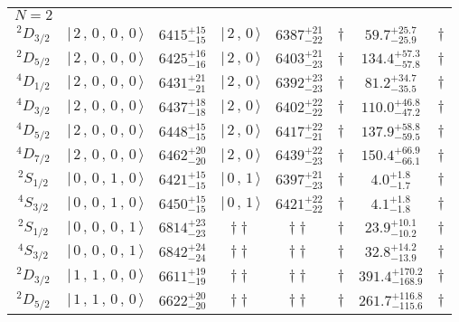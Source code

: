 \begin{tabular}{c| c c c c c c c}
\hline
 $N=2$  &  &  &  &  &  \\ 
$^{2}D_{3/2}$ & $\vert \,2\,,\,0\,,\,0\,,\,0 \,\rangle $ & $6415^{+15}_{-15}$ & $\vert \,2\,,\,0 \,\rangle$ & $6387^{+21}_{-22}$ & $\dagger$ & $59.7^{+25.7}_{-25.9}$ & $\dagger$ \\ 
$^{2}D_{5/2}$ & $\vert \,2\,,\,0\,,\,0\,,\,0 \,\rangle $ & $6425^{+16}_{-16}$ & $\vert \,2\,,\,0 \,\rangle$ & $6403^{+21}_{-23}$ & $\dagger$ & $134.4^{+57.3}_{-57.8}$ & $\dagger$ \\ 
$^{4}D_{1/2}$ & $\vert \,2\,,\,0\,,\,0\,,\,0 \,\rangle $ & $6431^{+21}_{-21}$ & $\vert \,2\,,\,0 \,\rangle$ & $6392^{+23}_{-23}$ & $\dagger$ & $81.2^{+34.7}_{-35.5}$ & $\dagger$ \\ 
$^{4}D_{3/2}$ & $\vert \,2\,,\,0\,,\,0\,,\,0 \,\rangle $ & $6437^{+18}_{-18}$ & $\vert \,2\,,\,0 \,\rangle$ & $6402^{+22}_{-22}$ & $\dagger$ & $110.0^{+46.8}_{-47.2}$ & $\dagger$ \\ 
$^{4}D_{5/2}$ & $\vert \,2\,,\,0\,,\,0\,,\,0 \,\rangle $ & $6448^{+15}_{-15}$ & $\vert \,2\,,\,0 \,\rangle$ & $6417^{+22}_{-21}$ & $\dagger$ & $137.9^{+58.8}_{-59.5}$ & $\dagger$ \\ 
$^{4}D_{7/2}$ & $\vert \,2\,,\,0\,,\,0\,,\,0 \,\rangle $ & $6462^{+20}_{-20}$ & $\vert \,2\,,\,0 \,\rangle$ & $6439^{+22}_{-23}$ & $\dagger$ & $150.4^{+66.9}_{-66.1}$ & $\dagger$ \\ 
$^{2}S_{1/2}$ & $\vert \,0\,,\,0\,,\,1\,,\,0 \,\rangle $ & $6421^{+15}_{-15}$ & $\vert \,0\,,\,1 \,\rangle$ & $6397^{+21}_{-23}$ & $\dagger$ & $4.0^{+1.8}_{-1.7}$ & $\dagger$ \\ 
$^{4}S_{3/2}$ & $\vert \,0\,,\,0\,,\,1\,,\,0 \,\rangle $ & $6450^{+15}_{-15}$ & $\vert \,0\,,\,1 \,\rangle$ & $6421^{+22}_{-22}$ & $\dagger$ & $4.1^{+1.8}_{-1.8}$ & $\dagger$ \\ 
$^{2}S_{1/2}$ & $\vert \,0\,,\,0\,,\,0\,,\,1 \,\rangle $ & $6814^{+23}_{-23}$ & $\dagger\dagger$ & $\dagger\dagger$ & $\dagger$ & $23.9^{+10.1}_{-10.2}$ & $\dagger$ \\ 
$^{4}S_{3/2}$ & $\vert \,0\,,\,0\,,\,0\,,\,1 \,\rangle $ & $6842^{+24}_{-24}$ & $\dagger\dagger$ & $\dagger\dagger$ & $\dagger$ & $32.8^{+14.2}_{-13.9}$ & $\dagger$ \\ 
$^{2}D_{3/2}$ & $\vert \,1\,,\,1\,,\,0\,,\,0 \,\rangle $ & $6611^{+19}_{-19}$ & $\dagger\dagger$ & $\dagger\dagger$ & $\dagger$ & $391.4^{+170.2}_{-168.9}$ & $\dagger$ \\ 
$^{2}D_{5/2}$ & $\vert \,1\,,\,1\,,\,0\,,\,0 \,\rangle $ & $6622^{+20}_{-20}$ & $\dagger\dagger$ & $\dagger\dagger$ & $\dagger$ & $261.7^{+116.8}_{-115.6}$ & $\dagger$ \\ 

\end{tabular}
